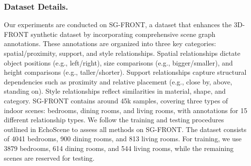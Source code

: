 \begin{table}[!t]
\centering
\caption{\textbf{Hardware and software} specifications for experimental setup.}
\label{tab: hardware}
\end{table}
\subsubsection{Dataset Details.}
Our experiments are conducted on SG-FRONT, a dataset that enhances the 3D-FRONT synthetic dataset by incorporating comprehensive scene graph annotations. These annotations are organized into three key categories: spatial/proximity, support, and style relationships. Spatial relationships dictate object positions (e.g., left/right), size comparisons (e.g., bigger/smaller), and height comparisons (e.g., taller/shorter). Support relationships capture structural dependencies such as proximity and relative placement (e.g., close by, above, standing on). Style relationships reflect similarities in material, shape, and category. 
SG-FRONT contains around 45k samples, covering three types of indoor scenes: bedrooms, dining rooms, and living rooms, with annotations for 15 different relationship types.
We follow the training and testing procedures outlined in EchoScene \cite{zhai2024echoscene} to assess all methods on SG-FRONT. The dataset consists of 4041 bedrooms, 900 dining rooms, and 813 living rooms. For training, we use 3879 bedrooms, 614 dining rooms, and 544 living rooms, while the remaining scenes are reserved for testing.

